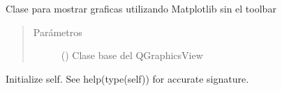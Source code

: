 \documentclass[letterpaper,10pt,spanish]{sphinxmanual}
\begin{document}

\begin{fulllineitems}
\label{\detokenize{codigos/Promociones:mlpwidget.MlpWidgetNoToolbar}}
Clase para mostrar graficas utilizando Matplotlib sin el toolbar
\begin{quote}\begin{description}
\item[{Parámetros}] \leavevmode
{} () \textendash{} Clase base del QGraphicsView

\end{description}\end{quote}

\begin{fulllineitems}
\label{\detokenize{codigos/Promociones:mlpwidget.MlpWidgetNoToolbar.__init__}}
Initialize self.  See help(type(self)) for accurate signature.

\end{fulllineitems}


\end{fulllineitems}

\end{document}
